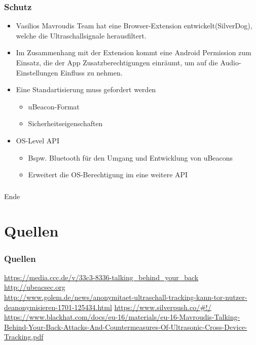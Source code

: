 \documentclass{beamer}
\begin{document}
	\begin{frame}\frametitle{Schutz}
	\begin{itemize}
		\item Vasilios Mavroudis Team hat eine Browser-Extension entwickelt(SilverDog), welche die Ultraschallsignale herausfiltert.
		\item Im Zusammenhang mit der Extension kommt eine Android Permission zum Einsatz, die der App Zusatzberechtigungen einräumt, um auf die Audio-Einstellungen Einfluss zu nehmen.
		\item Eine Standartisierung muss gefordert werden
		\begin{itemize}
			\item uBeacon-Format
			\item Sicherheitseigenschaften
		\end{itemize}
		\item OS-Level API
		\begin{itemize}
			\item Bspw. Bluetooth für den Umgang und Entwicklung von uBeacons
			\item Erweitert die OS-Berechtigung im eine weitere API
		\end{itemize}
	\end{itemize} 
	\end{frame}
	
	\begin{frame}\frametitle{}
	\center\huge{Ende}
	\end{frame}

\section*{Quellen}\small
	\begin{frame}\frametitle{Quellen}
		\url{https://media.ccc.de/v/33c3-8336-talking_behind_your_back} \\
		\url{http://ubeacsec.org} \\
		\url{http://www.golem.de/news/anonymitaet-ultraschall-tracking-kann-tor-nutzer-deanonymisieren-1701-125434.html}
		\url{https://www.silverpush.co/\#!/} \\
		\url{https://www.blackhat.com/docs/eu-16/materials/eu-16-Mavroudis-Talking-Behind-Your-Back-Attacks-And-Countermeasures-Of-Ultrasonic-Cross-Device-Tracking.pdf}\\
	\end{frame}
\end{document}
